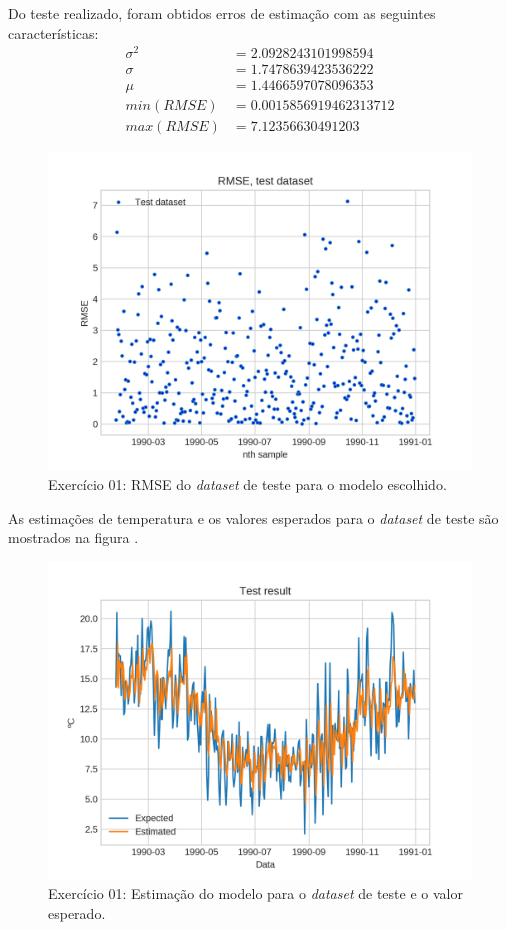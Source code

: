 \documentclass{article}
\begin{document}
    Do teste realizado, foram obtidos erros de estimação  com as seguintes características:
    \begin{align}
       \sigma^2&=2.0928243101998594\\
       \sigma&=1.7478639423536222\\
       \mu&=1.4466597078096353\\
       min(RMSE)&=0.0015856919462313712\\
       max(RMSE)&=7.12356630491203 
   \end{align}

   \begin{figure}[!ht]
        \centering
        \includegraphics[width=\linewidth]{ex01/model.png}
        \caption{Exercício 01: RMSE do \textit{dataset} de teste para o modelo escolhido.}
        \label{fig:ex1_kfold_rmse}
    \end{figure}
    As estimações de temperatura e os valores esperados para o \textit{dataset} de teste são
    mostrados na figura .
    \begin{figure}[!ht]
        \centering
        \includegraphics[width=\linewidth]{ex01/model_comp.png}
        \caption{Exercício 01: Estimação do modelo para o \textit{dataset} de teste e o valor esperado.}
        \label{fig:ex1_model_comp}
    \end{figure}
    
\end{document}
